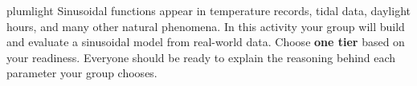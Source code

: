 \documentclass[10pt]{article}
\begin{document}
\namepartnerperiod

\vspace{0.10in}

\begin{scenariobox}{plumlight}
Sinusoidal functions appear in temperature records, tidal data, daylight hours,
and many other natural phenomena. In this activity your group will build and
evaluate a sinusoidal model from real-world data. Choose \textbf{one tier}
based on your readiness. Everyone should be ready to explain the reasoning
behind each parameter your group chooses.
\end{scenariobox}

\vspace{0.08in}
\end{document}
